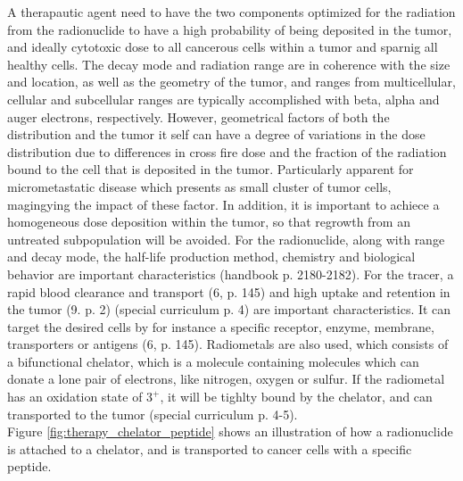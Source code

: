 \documentclass[a4paper,11pt,twoside]{book}
\begin{document}
A therapautic agent need to have the two components optimized for the radiation from the radionuclide to have a high probability of being deposited in the tumor, and ideally cytotoxic dose to all cancerous cells within a tumor and sparnig all healthy cells. The decay mode and radiation range are in coherence with the size and location, as well as the geometry of the tumor, and ranges from multicellular, cellular and subcellular ranges are typically accomplished with beta, alpha and auger electrons, respectively. However, geometrical factors of both the distribution and the tumor it self can have a degree of variations in the dose distribution due to differences in cross fire dose and the fraction of the radiation bound to the cell that is deposited in the tumor. Particularly apparent for micrometastatic disease which presents as small cluster of tumor cells, magingying the impact of these factor. In addition, it is important to achiece a homogeneous dose deposition within the tumor, so that regrowth from an untreated subpopulation will be avoided. For the radionuclide, along with range and decay mode, the half-life production method, chemistry and biological behavior are important characteristics (handbook p. 2180-2182). For the tracer, a rapid blood clearance and transport (6, p. 145) and high uptake and retention in the tumor (9. p. 2)    (special curriculum p. 4) are important characteristics. It can target the desired cells by for instance a specific receptor, enzyme, membrane, transporters or antigens (6, p. 145). Radiometals are also used, which consists of a bifunctional chelator, which is a molecule containing molecules which can donate a lone pair of electrons, like nitrogen, oxygen or sulfur. If the radiometal has an oxidation state of $3^+$, it will be tighlty bound by the chelator, and can transported to the tumor (special curriculum p. 4-5). \\

Figure \ref{fig:therapy_chelator_peptide} shows an illustration of how a radionuclide is attached to a chelator, and is transported to cancer cells with a specific peptide. 
\end{document}
